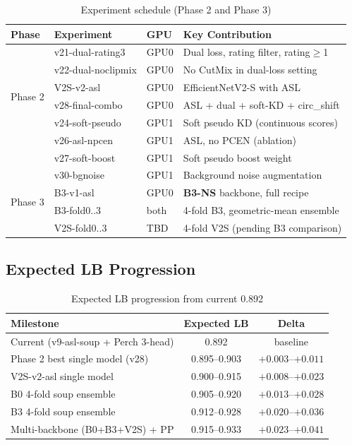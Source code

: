 \documentclass[11pt,a4paper]{article}
\begin{document}
\begin{table}[H]
\centering
\caption{Experiment schedule (Phase 2 and Phase 3)}
\begin{tabular}{llll}
\toprule
\textbf{Phase} & \textbf{Experiment} & \textbf{GPU} & \textbf{Key Contribution} \\
\midrule
\multirow{6}{*}{Phase 2}
 & v21-dual-rating3    & GPU0 & Dual loss, rating filter, rating$\geq$1 \\
 & v22-dual-noclipmix  & GPU0 & No CutMix in dual-loss setting \\
 & V2S-v2-asl          & GPU0 & EfficientNetV2-S with ASL \\
 & v28-final-combo     & GPU0 & ASL + dual + soft-KD + circ\_shift \\
 & v24-soft-pseudo     & GPU1 & Soft pseudo KD (continuous scores) \\
 & v26-asl-npcen       & GPU1 & ASL, no PCEN (ablation) \\
 & v27-soft-boost      & GPU1 & Soft pseudo boost weight \\
\midrule
\multirow{5}{*}{Phase 3}
 & v30-bgnoise         & GPU1 & Background noise augmentation \\
 & B3-v1-asl           & GPU0 & \textbf{B3-NS} backbone, full recipe \\
 & B3-fold0..3         & both & 4-fold B3, geometric-mean ensemble \\
 & V2S-fold0..3        & TBD  & 4-fold V2S (pending B3 comparison) \\
\bottomrule
\end{tabular}
\end{table}

\subsection{Expected LB Progression}

\begin{table}[H]
\centering
\caption{Expected LB progression from current 0.892}
\begin{tabular}{lcc}
\toprule
\textbf{Milestone} & \textbf{Expected LB} & \textbf{Delta} \\
\midrule
Current (v9-asl-soup + Perch 3-head) & 0.892 & baseline \\
Phase 2 best single model (v28)        & 0.895--0.903 & $+0.003$--$+0.011$ \\
V2S-v2-asl single model               & 0.900--0.915 & $+0.008$--$+0.023$ \\
B0 4-fold soup ensemble               & 0.905--0.920 & $+0.013$--$+0.028$ \\
B3 4-fold soup ensemble               & 0.912--0.928 & $+0.020$--$+0.036$ \\
Multi-backbone (B0+B3+V2S) + PP       & 0.915--0.933 & $+0.023$--$+0.041$ \\
\bottomrule
\end{tabular}
\end{table}
\end{document}
